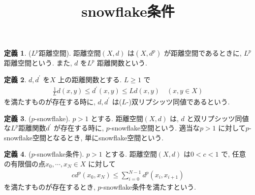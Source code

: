 \documentclass[10pt, fleqn, label-section=none]{bxjsarticle}
\title{snowflake条件}
\date{}
\author{}
\theoremstyle{definition}
\newtheorem{dfn}{定義}[section]
\renewcommand{\;}{\, ; \,}
\begin{document}
\maketitle

\section{}

\begin{dfn}($L^p$距離空間). 距離空間$(X, d)$ は$(X, d^p)$ が距離空間であるときに, $L^p$ 距離空間という.  また, $d$ を$L^p$ 距離関数という. 
\end{dfn}

\begin{dfn}$d, d^\prime$ を$X$ 上の距離関数とする. $L \geq  1$ で
\begin{align*} \frac{1}{L} d(x, y) \leq d^\prime(x, y) \leq L d(x, y) \quad (x, y \in X) \end{align*} 
を満たすものが存在する時に, $d, d^\prime$ は($L$-)双リプシッツ同値であるという. 
\end{dfn}

\begin{dfn}($p$-snowflake). $p > 1$ とする. 距離空間$(X, d)$ は, $d$ と双リプシッツ同値な$L^p$距離関数$d^\prime$ が存在する時に, $p$-snowflake空間という. 適当な$p > 1$ に対して$p$-snowflake空間となるとき, 単にsnowflake空間という. 
\end{dfn}

\begin{dfn}($p$-snowflake条件). $p > 1$ とする. 距離空間$(X, d)$ は$0< c < 1$ で, 任意の有限個の点$x_0, \cdots , x_N \in X$ に対して
\begin{align*} c d^p(x_0, x_N) \leq \sum_{i = 0}^{N-1} d^p (x_i, x_{i+1})  \end{align*}
を満たすものが存在するとき, $p$-snowflake条件を満たすという. 
\end{dfn}
\end{document}
